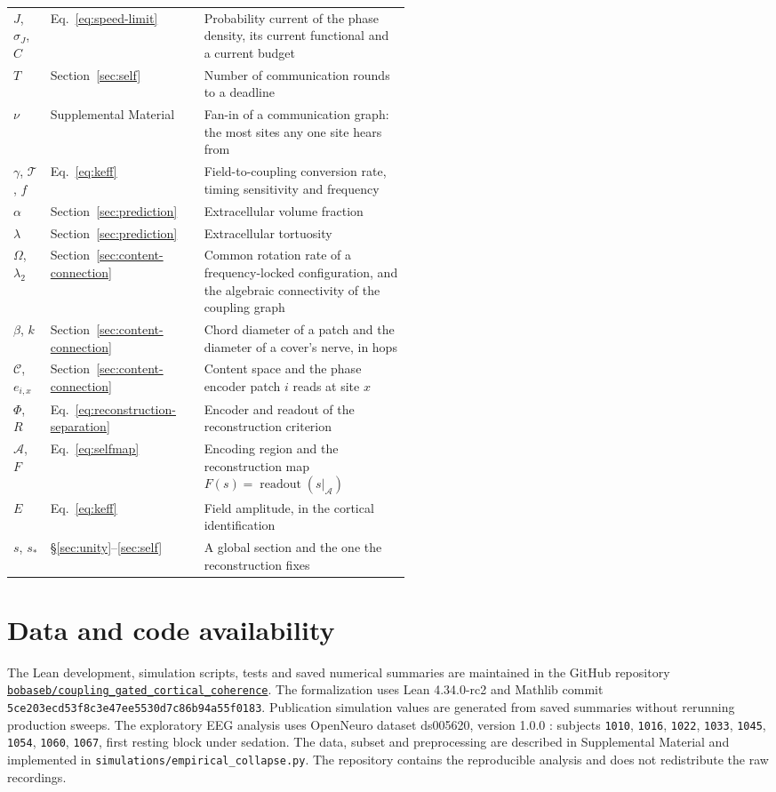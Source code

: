 \documentclass[12pt]{article}
\renewcommand{\cite}[1]{\citep{#1}}
\begin{document}
\begin{longtable}{@{}llp{0.52\linewidth}@{}}
$J$, $\sigma_J$, $C$ & Eq.~\eqref{eq:speed-limit} & Probability current of the phase density, its current functional and a current budget \\
$T$ & Section~\ref{sec:self} & Number of communication rounds to a deadline \\
$\nu$ & Supplemental Material & Fan-in of a communication graph: the most sites any one site hears from \\
$\gamma$, $\mathcal{T}$, $f$ & Eq.~\eqref{eq:keff} & Field-to-coupling conversion rate, timing sensitivity and frequency \\
$\alpha$ & Section~\ref{sec:prediction} & Extracellular volume fraction \\
$\lambda$ & Section~\ref{sec:prediction} & Extracellular tortuosity \\
$\Omega$, $\lambda_2$ & Section~\ref{sec:content-connection} & Common rotation rate of a frequency-locked configuration, and the algebraic connectivity of the coupling graph \\
$\beta$, $k$ & Section~\ref{sec:content-connection} & Chord diameter of a patch and the diameter of a cover's nerve, in hops \\
$\mathcal{C}$, $e_{i,x}$ & Section~\ref{sec:content-connection} & Content space and the phase encoder patch $i$ reads at site $x$ \\
$\Phi$, $R$ & Eq.~\eqref{eq:reconstruction-separation} & Encoder and readout of the reconstruction criterion \\
$\mathcal{A}$, $F$ & Eq.~\eqref{eq:selfmap} & Encoding region and the reconstruction map $F(s)=\operatorname{readout}(s|_{\mathcal{A}})$ \\
$E$ & Eq.~\eqref{eq:keff} & Field amplitude, in the cortical identification \\
$s$, $s_*$ & \S\ref{sec:unity}--\ref{sec:self} & A global section and the one the reconstruction fixes \\
\end{longtable}
\endgroup

\section*{Data and code availability}

The Lean development, simulation scripts, tests and saved numerical summaries are maintained in the GitHub repository \href{https://github.com/bobaseb/coupling_gated_cortical_coherence}{\nolinkurl{bobaseb/coupling_gated_cortical_coherence}}. The formalization uses Lean 4.34.0-rc2 and Mathlib commit \texttt{5ce203ecd53f8c3e47ee5530d7c86b94a55f0183}. Publication simulation values are generated from saved summaries without rerunning production sweeps. The exploratory EEG analysis uses OpenNeuro dataset ds005620, version 1.0.0 \cite{bajwa2024data,bajwa2025}: subjects \texttt{1010}, \texttt{1016}, \texttt{1022}, \texttt{1033}, \texttt{1045}, \texttt{1054}, \texttt{1060}, \texttt{1067}, first resting block under sedation. The data, subset and preprocessing are described in Supplemental Material and implemented in \texttt{simulations/empirical\_collapse.py}. The repository contains the reproducible analysis and does not redistribute the raw recordings.
\end{document}

